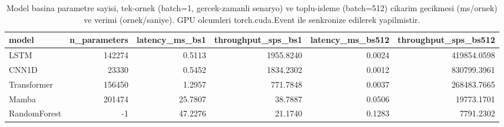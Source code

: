 \begin{table}[ht]
\centering
\caption{Model basina parametre sayisi, tek-ornek (batch=1, gercek-zamanli senaryo) ve toplu-isleme (batch=512) cikarim gecikmesi (ms/ornek) ve verimi (ornek/saniye). GPU olcumleri torch.cuda.Event ile senkronize edilerek yapilmistir.}
\label{tab:T4_cikarim_verimliligi}
\begin{tabular}{lrrrrr}
\toprule
model & n\_parameters & latency\_ms\_bs1 & throughput\_sps\_bs1 & latency\_ms\_bs512 & throughput\_sps\_bs512 \\
\midrule
LSTM & 142274 & 0.5113 & 1955.8240 & 0.0024 & 419854.0598 \\
CNN1D & 23330 & 0.5452 & 1834.2302 & 0.0012 & 830799.3961 \\
Transformer & 156450 & 1.2957 & 771.7848 & 0.0037 & 268483.7665 \\
Mamba & 201474 & 25.7807 & 38.7887 & 0.0506 & 19773.1701 \\
RandomForest & -1 & 47.2276 & 21.1740 & 0.1283 & 7791.2302 \\
\bottomrule
\end{tabular}

\end{table}
